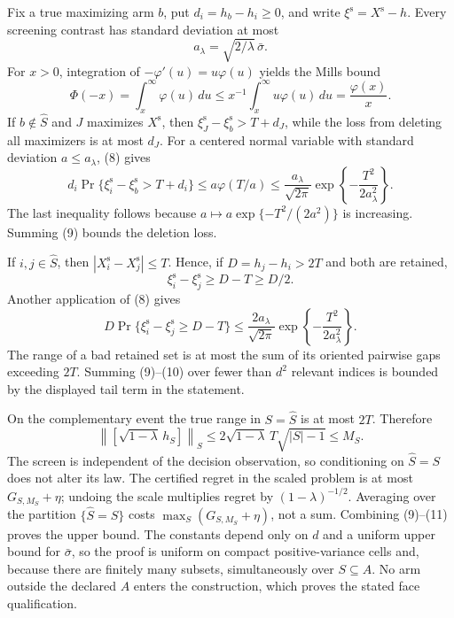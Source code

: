 Fix a true maximizing arm \(b\), put \(d_i=h_b-h_i\geq0\), and write \(\xi^{\mathrm s}=X^{\mathrm s}-h\).  Every screening contrast has standard deviation at most
\[
a_\lambda=\sqrt{2/\lambda}\,\bar\sigma. \tag{7}
\]
For \(x>0\), integration of \(-\varphi'(u)=u\varphi(u)\) yields the Mills bound
\[
\Phi(-x)=\int_x^\infty\varphi(u)\,du
\leq x^{-1}\int_x^\infty u\varphi(u)\,du
=\frac{\varphi(x)}x. \tag{8}
\]
If \(b\notin\widehat S\) and \(J\) maximizes \(X^{\mathrm s}\), then \(\xi_J^{\mathrm s}-\xi_b^{\mathrm s}>T+d_J\), while the loss from deleting all maximizers is at most \(d_J\).  For a centered normal variable with standard deviation \(a\leq a_\lambda\), (8) gives
\[
d_i\Pr\{\xi_i^{\mathrm s}-\xi_b^{\mathrm s}>T+d_i\}
\leq a\varphi(T/a)
\leq\frac{a_\lambda}{\sqrt{2\pi}}
       \exp\!\left\{-\frac{T^2}{2a_\lambda^2}\right\}. \tag{9}
\]
The last inequality follows because \(a\mapsto a\exp\{-T^2/(2a^2)\}\) is increasing.  Summing (9) bounds the deletion loss.

If \(i,j\in\widehat S\), then \(|X_i^{\mathrm s}-X_j^{\mathrm s}|\leq T\).  Hence, if \(D=h_j-h_i>2T\) and both are retained,
\[
\xi_i^{\mathrm s}-\xi_j^{\mathrm s}\geq D-T\geq D/2.
\]
Another application of (8) gives
\[
D\Pr\{\xi_i^{\mathrm s}-\xi_j^{\mathrm s}\geq D-T\}
\leq \frac{2a_\lambda}{\sqrt{2\pi}}
       \exp\!\left\{-\frac{T^2}{2a_\lambda^2}\right\}. \tag{10}
\]
The range of a bad retained set is at most the sum of its oriented pairwise gaps exceeding \(2T\).  Summing (9)--(10) over fewer than \(d^2\) relevant indices is bounded by the displayed tail term in the statement.

On the complementary event the true range in \(S=\widehat S\) is at most \(2T\).  Therefore
\[
\left\lVert[\sqrt{1-\lambda}\,h_S]\right\rVert_S
\leq2\sqrt{1-\lambda}\,T\sqrt{|S|-1}\leq M_S. \tag{11}
\]
The screen is independent of the decision observation, so conditioning on \(\widehat S=S\) does not alter its law.  The certified regret in the scaled problem is at most \(G_{S,M_S}+\eta\); undoing the scale multiplies regret by \((1-\lambda)^{-1/2}\).  Averaging over the partition \(\{\widehat S=S\}\) costs \(\max_S(G_{S,M_S}+\eta)\), not a sum.  Combining (9)--(11) proves the upper bound.  The constants depend only on \(d\) and a uniform upper bound for \(\bar\sigma\), so the proof is uniform on compact positive-variance cells and, because there are finitely many subsets, simultaneously over \(S\subseteq A\).  No arm outside the declared \(A\) enters the construction, which proves the stated face qualification.